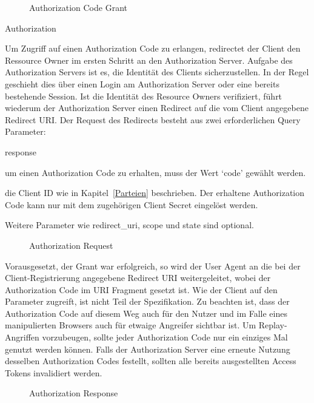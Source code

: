 \begin{figure}[h]
    \scalebox{.6}{
        
    }
    \caption{Authorization Code Grant}\label{fig: Authorization Code Grant}
\end{figure}

\begin{labeling}{Authorization}
    \item [Authorization Code Retrieval (1--6)] Um Zugriff auf einen
    Authorization Code zu erlangen, redirectet der Client den Ressource Owner im
    ersten Schritt an den Authorization Server. Aufgabe des Authorization
    Servers ist es, die Identität des Clients sicherzustellen. In der Regel
    geschieht dies über einen Login am Authorization Server oder eine bereits
    bestehende Session. Ist die Identität des Resource Owners verifiziert, führt
    wiederum der Authorization Server einen Redirect auf die vom Client
    angegebene Redirect URI. Der Request des Redirects besteht aus zwei
    erforderlichen Query Parameter:
    \begin{labeling}{response}
        \item [response\_type] um einen Authorization Code zu erhalten,
        muss der Wert `code' gewählt werden.
        \item [client\_id] die Client ID wie in Kapitel~\ref{Parteien}
        beschrieben. Der erhaltene Authorization Code kann nur mit dem
        zugehörigen Client Secret eingelöst werden.
    \end{labeling}
    Weitere Parameter wie redirect\_uri, scope und state sind optional.
    \begin{figure}[h]
        \scalebox{.8}{
            
        }
        \caption{Authorization Request}\label{ls: Authorization Request}
    \end{figure}
    Vorausgesetzt, der Grant war erfolgreich, so wird der User Agent an die bei
    der Client-Registrierung angegebene Redirect URI weitergeleitet, wobei der
    Authorization Code im URI Fragment gesetzt ist. Wie der Client auf den
    Parameter zugreift, ist nicht Teil der Spezifikation. Zu beachten ist, dass
    der Authorization Code auf diesem Weg auch für den Nutzer und im Falle eines
    manipulierten Browsers auch für etwaige Angreifer sichtbar ist. Um
    Replay-Angriffen vorzubeugen, sollte jeder Authorization Code nur ein
    einziges Mal genutzt werden können. Falls der Authorization Server eine
    erneute Nutzung desselben Authorization Codes festellt, sollten alle bereits
    ausgestellten Access Tokens invalidiert werden.
    \begin{figure}[h]
        \scalebox{.8}{
            
        }
        \caption{Authorization Response}\label{ls: Authorization Response}
    \end{figure}


\end{labeling}
